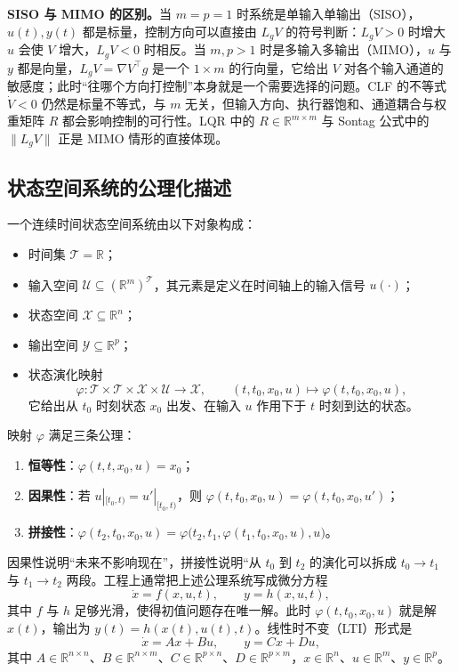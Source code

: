 \documentclass[11pt, a4paper, UTF8, fontset=none]{ctexart}
\theoremstyle{cnthm}
\newcommand{\R}{\mathbb{R}}
\newcommand{\X}{\mathcal{X}}
\newcommand{\U}{\mathcal{U}}
\newcommand{\Y}{\mathcal{Y}}
\newcommand{\T}{\mathcal{T}}
\newcommand{\norm}[1]{\lVert #1\rVert}
\newcommand{\Lg}{L_g}
\begin{document}
\textbf{SISO 与 MIMO 的区别。}当 $m=p=1$ 时系统是单输入单输出（SISO），$u(t),y(t)$ 都是标量，控制方向可以直接由 $\Lg V$ 的符号判断：$\Lg V>0$ 时增大 $u$ 会使 $V$ 增大，$\Lg V<0$ 时相反。当 $m,p>1$ 时是多输入多输出（MIMO），$u$ 与 $y$ 都是向量，$\Lg V=\nabla V^\top g$ 是一个 $1\times m$ 的行向量，它给出 $V$ 对各个输入通道的敏感度；此时“往哪个方向打控制”本身就是一个需要选择的问题。CLF 的不等式 $\dot V<0$ 仍然是标量不等式，与 $m$ 无关，但输入方向、执行器饱和、通道耦合与权重矩阵 $R$ 都会影响控制的可行性。LQR 中的 $R\in\R^{m\times m}$ 与 Sontag 公式中的 $\norm{\Lg V}$ 正是 MIMO 情形的直接体现。

\subsection{状态空间系统的公理化描述}

一个连续时间状态空间系统由以下对象构成：
\begin{itemize}
  \item 时间集 $\T=\R$；
  \item 输入空间 $\U\subseteq(\R^m)^{\T}$，其元素是定义在时间轴上的输入信号 $u(\cdot)$；
  \item 状态空间 $\X\subseteq\R^n$；
  \item 输出空间 $\Y\subseteq\R^p$；
  \item 状态演化映射
  \begin{equation}
    \varphi:\T\times\T\times\X\times\U\longrightarrow\X,
    \qquad (t,t_0,x_0,u)\longmapsto \varphi(t,t_0,x_0,u),
  \end{equation}
  它给出从 $t_0$ 时刻状态 $x_0$ 出发、在输入 $u$ 作用下于 $t$ 时刻到达的状态。
\end{itemize}
映射 $\varphi$ 满足三条公理：
\begin{enumerate}[label=(A\arabic*)]
  \item \textbf{恒等性}：$\varphi(t,t,x_0,u)=x_0$；
  \item \textbf{因果性}：若 $u|_{[t_0,t)}=u'|_{[t_0,t)}$，则 $\varphi(t,t_0,x_0,u)=\varphi(t,t_0,x_0,u')$；
  \item \textbf{拼接性}：$\varphi(t_2,t_0,x_0,u)=\varphi\bigl(t_2,t_1,\varphi(t_1,t_0,x_0,u),u\bigr)$。
\end{enumerate}
因果性说明“未来不影响现在”，拼接性说明“从 $t_0$ 到 $t_2$ 的演化可以拆成 $t_0\to t_1$ 与 $t_1\to t_2$ 两段。工程上通常把上述公理系统写成微分方程
\begin{equation}
  \dot x=f(x,u,t),\qquad y=h(x,u,t),
  \label{eq:state-space}
\end{equation}
其中 $f$ 与 $h$ 足够光滑，使得初值问题存在唯一解。此时 $\varphi(t,t_0,x_0,u)$ 就是解 $x(t)$，输出为 $y(t)=h(x(t),u(t),t)$。线性时不变（LTI）形式是
\begin{equation}
  \dot x=Ax+Bu,\qquad y=Cx+Du,
  \label{eq:lti}
\end{equation}
其中 $A\in\R^{n\times n}$、$B\in\R^{n\times m}$、$C\in\R^{p\times n}$、$D\in\R^{p\times m}$，$x\in\R^n$、$u\in\R^m$、$y\in\R^p$。
\end{document}
